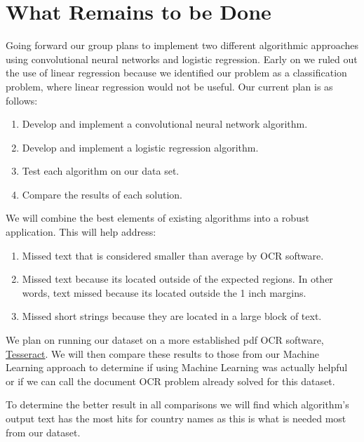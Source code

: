 \documentclass{article}
\begin{document}
\section{What Remains to be Done}
Going forward our group plans to implement two different algorithmic approaches using convolutional neural networks and logistic regression.
Early on we ruled out the use of linear regression because we identified our problem as a classification problem, where linear regression would not be useful.
Our current plan is as follows:
\begin{enumerate}
    \item Develop and implement a convolutional neural network algorithm.
    \item Develop and implement a logistic regression algorithm.
    \item Test each algorithm on our data set.
    \item Compare the results of each solution.
\end{enumerate}

We will combine the best elements of existing algorithms into a robust application.
This will help address:
\begin{enumerate}
    \item Missed text that is considered smaller than average by OCR software.
    \item Missed text because its located outside of the expected regions. In other words, text missed because its located outside the 1 inch margins.
    \item Missed short strings because they are located in a large block of text.
\end{enumerate}


We plan on running our dataset on a more established pdf OCR software, \href{https://github.com/tesseract-ocr/tesseract}{Tesseract}\cite{Tesseract}. We will then compare these results to those from our Machine Learning approach to determine if using Machine Learning was actually helpful or if we can call the document OCR problem already solved for this dataset.

To determine the better result in all comparisons we will find which algorithm's output text has the most hits for country names as this is what is needed most from our dataset.



\end{document}

